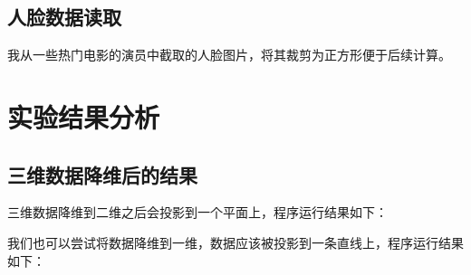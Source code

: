\documentclass[12pt]{article}
\begin{document}
\subsection{人脸数据读取}
我从一些热门电影的演员中截取的人脸图片，将其裁剪为正方形便于后续计算。
\section{实验结果分析}
\subsection{三维数据降维后的结果}
三维数据降维到二维之后会投影到一个平面上，程序运行结果如下：\par
\begin{figure}[H]
    \centering
\end{figure}
\begin{figure}[H]
    \centering
\end{figure}
我们也可以尝试将数据降维到一维，数据应该被投影到一条直线上，程序运行结果如下：\par
\end{document}
